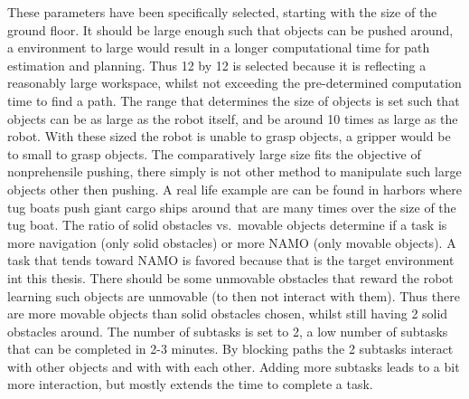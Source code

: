 These parameters have been specifically selected, starting with the size of the ground floor. It should be large enough such that objects can be pushed around, a environment to large would result in a longer computational time for path estimation and planning. Thus 12 by 12 is selected because it is reflecting a reasonably large workspace, whilst not exceeding the pre-determined computation time to find a path. The range that determines the size of objects is set such that objects can be as large as the robot itself, and be around 10 times as large as the robot. With these sized the robot is unable to grasp objects, a gripper would be to small to grasp objects. The comparatively large size fits the objective of nonprehensile pushing, there simply is not other method to manipulate such large objects other then pushing. A real life example are can be found in harbors where tug boats push giant cargo ships around that are many times over the size of the tug boat. The ratio of solid obstacles vs.~movable objects determine if a task is more navigation (only solid obstacles) or more \ac{NAMO} (only movable objects). A task that tends toward \ac{NAMO} is favored because that is the target environment int this thesis. There should be some unmovable obstacles that reward the robot learning such objects are unmovable (to then not interact with them). Thus there are more movable objects than solid obstacles chosen, whilst still having 2 solid obstacles around. The number of subtasks is set to 2, a low number of subtasks that can be completed in 2-3 minutes. By blocking paths the 2 subtasks interact with other objects and with with each other. Adding more subtasks leads to a bit more interaction, but mostly extends the time to complete a task. 

